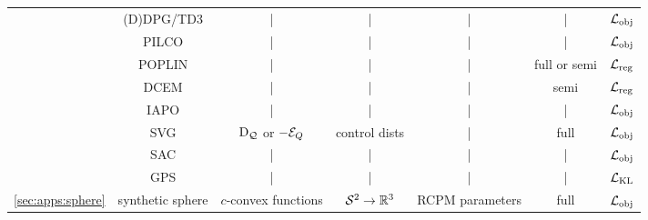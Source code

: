 {\begin{tabular}{ccccccc}
& (D)DPG/TD3 & | & | & | & | & ${\mathcal{L}}_{\rm obj}$ \\
& PILCO & | & | & | & | & ${\mathcal{L}}_{\rm obj}$ \\
& POPLIN & | & | & | & full or semi & ${\mathcal{L}}_{\rm reg}$ \\
& DCEM & | & | & | & semi & ${\mathcal{L}}_{\rm reg}$ \\
& IAPO & | & | & | & | & ${\mathcal{L}}_{\rm obj}$ \\
& SVG & $\mathrm{D}_{\mathcal{Q}}$ or $-{\mathcal{E}}_Q$ & control dists & | & full & ${\mathcal{L}}_{\rm obj}$ \\
& SAC & | & | & | & | & ${\mathcal{L}}_{\rm obj}$ \\
& GPS & | & | & | & | & ${\mathcal{L}}_{\rm KL}$ \\
\midrule
\ref{sec:apps:sphere} & synthetic sphere & $c$-convex functions & ${\mathcal{S}}^2\rightarrow \mathbb{R}^3$ & RCPM parameters & full & ${\mathcal{L}}_{\rm obj}$ \\
\bottomrule
\end{tabular}}

